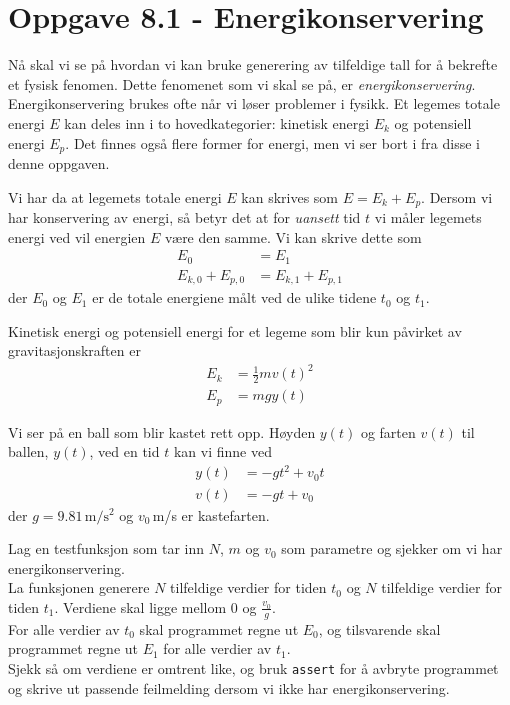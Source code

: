 \documentclass[10pt,a4paper]{article}
\begin{document}
\section*{Oppgave 8.1 - Energikonservering}

Nå skal vi se på hvordan vi kan bruke generering av tilfeldige tall for å bekrefte et fysisk fenomen. Dette fenomenet som vi skal se på, er \textit{energikonservering}. Energikonservering brukes ofte når vi løser problemer i fysikk. Et legemes totale energi $E$ kan deles inn i to hovedkategorier: kinetisk energi $E_k$ og 
potensiell energi $E_p$. Det finnes også flere former for energi, men vi ser bort i fra disse i denne oppgaven. 
 
Vi har da at legemets totale energi $E$ kan skrives som $E = E_k + E_p$. 
Dersom vi har konservering av energi, så betyr det at for \textit{uansett} tid $t$ vi måler legemets energi ved vil energien $E$ være den samme. Vi kan skrive dette som
\begin{align*}
E_0 &= E_1 \\
E_{k,0} + E_{p,0} &= E_{k,1} + E_{p,1}
\end{align*}
der $E_0$ og $E_1$ er de totale energiene målt ved de ulike tidene $t_0$ og $t_1$. 
 
Kinetisk energi og potensiell energi for et legeme som blir kun påvirket av gravitasjonskraften er
\begin{align*}
E_k &= \frac{1}{2}mv(t)^2 \\
E_p &= mgy(t)
\end{align*}
 
Vi ser på en ball som blir kastet rett opp. Høyden $y(t)$ og farten $v(t)$ til ballen, $y(t)$, ved en tid $t$ kan vi finne ved
\begin{align*}
y(t) &= -gt^2 + v_0t \\
v(t) &= -gt + v_0
\end{align*}
der $g = 9.81\,\mathrm{m/s^2}$ og $v_0\,$m/s er kastefarten. 
 
Lag en testfunksjon som tar inn $N$, $m$ og $v_0$ som parametre og sjekker om vi har energikonservering. \\
La funksjonen generere $N$ tilfeldige verdier for tiden $t_0$ og $N$ tilfeldige verdier for tiden $t_1$. Verdiene skal ligge mellom 0 og $\frac{v_0}{g}$. \\
For alle verdier av $t_0$ skal programmet regne ut $E_0$, og tilsvarende skal programmet regne ut $E_1$ for alle verdier av $t_1$. \\
Sjekk så om verdiene er omtrent like, og bruk \texttt{assert} for å avbryte programmet og skrive ut passende feilmelding dersom vi ikke har energikonservering. 
 
\end{document}
